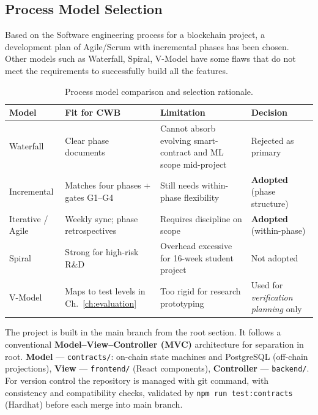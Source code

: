 \documentclass[12pt,a4paper]{report}
\newcommand{\tableheadcolor}{\rowcolor{TableHeadBg}}
\begin{document}
\subsection{Process Model Selection}
\label{sec:process-model-selection}
\label{sec:mvc-pattern}

Based on the Software engineering process for a blockchain project, a development plan of Agile/Scrum with incremental phases has been chosen. Other models such as Waterfall, Spiral, V-Model have some flaws that do not meet the requirements to successfully build all the features.

\begin{table}[H]
\centering
\caption[Process model comparison]{Process model comparison and selection rationale.}
\label{tab:process-model-comparison}
\small
\begin{tabular}{@{}p{2.4cm}p{3.2cm}p{3.2cm}p{5.4cm}@{}}
\toprule
\tableheadcolor
\textbf{Model} & \textbf{Fit for CWB} & \textbf{Limitation} & \textbf{Decision} \\
\midrule
Waterfall & Clear phase documents & Cannot absorb evolving smart-contract and ML scope mid-project & Rejected as primary \\
Incremental & Matches four phases + gates G1--G4 & Still needs within-phase flexibility & \textbf{Adopted} (phase structure) \\
Iterative / Agile & Weekly sync; phase retrospectives & Requires discipline on scope & \textbf{Adopted} (within-phase) \\
Spiral & Strong for high-risk R\&D & Overhead excessive for 16-week student project & Not adopted \\
V-Model & Maps to test levels in Ch.~\ref{ch:evaluation} & Too rigid for research prototyping & Used for \textit{verification planning} only \\
\bottomrule
\end{tabular}
\end{table}

The project is built in the main branch from the root section. It follows a conventional \textbf{Model--View--Controller (MVC)} architecture for separation in root. \textbf{Model} --- \texttt{contracts/}: on-chain state machines and PostgreSQL (off-chain projections), \textbf{View} --- \texttt{frontend/} (React components), \textbf{Controller} --- \texttt{backend/}. For version control the repository is managed with git command, with consistency and compatibility checks, validated by \texttt{npm run test:contracts} (Hardhat) before each merge into main branch.
\end{document}
